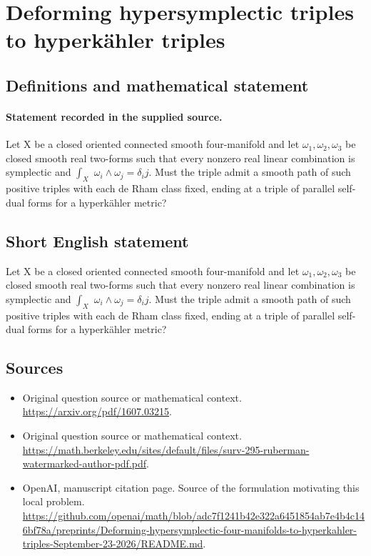 \documentclass[11pt]{article}
\begin{document}
\section*{Deforming hypersymplectic triples to hyperkähler triples}\label{statement}
\subsection{Definitions and mathematical statement}
\paragraph{Statement recorded in the supplied source.}
Let X be a closed oriented connected smooth four-manifold and let $\omega _{1},\omega _{2},\omega _{3}$ be closed smooth real two-forms such that every nonzero real linear combination is symplectic and $\int _X$ $\omega _i\wedge \omega _j=\delta _ij$. Must the triple admit a smooth path of such positive triples with each de Rham class fixed, ending at a triple of parallel self-dual forms for a hyperkähler metric?
\subsection{Short English statement}
Let X be a closed oriented connected smooth four-manifold and let $\omega _{1},\omega _{2},\omega _{3}$ be closed smooth real two-forms such that every nonzero real linear combination is symplectic and $\int _X$ $\omega _i\wedge \omega _j=\delta _ij$. Must the triple admit a smooth path of such positive triples with each de Rham class fixed, ending at a triple of parallel self-dual forms for a hyperkähler metric?
\subsection{Sources}
\begin{itemize}
\item[S1] Original question source or mathematical context.
\url{https://arxiv.org/pdf/1607.03215}.
\item[S2] Original question source or mathematical context.
\url{https://math.berkeley.edu/sites/default/files/surv-295-ruberman-watermarked-author-pdf.pdf}.
\item[S3] OpenAI, manuscript citation page. Source of the formulation motivating this local problem.
\url{https://github.com/openai/math/blob/adc7f1241b42e322a6451854ab7e4b4c146bf78a/preprints/Deforming-hypersymplectic-four-manifolds-to-hyperkahler-triples-September-23-2026/README.md}.
\end{itemize}
\end{document}
